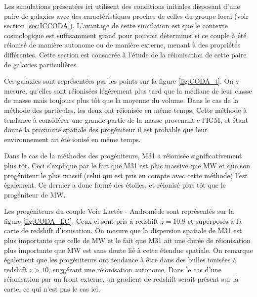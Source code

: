 Les simulations présentées ici utilisent des conditions initiales disposant d'une paire de galaxies avec des caractéristiques proches de celles du groupe local (voir section \ref{sec:ICCODA}).
L'avantage de cette simulation est que le contexte cosmologique est suffisamment grand pour pouvoir déterminer si ce couple à été réionisé de manière autonome ou de manière externe, menant à des propriétés différentes.
Cette section est consacrée à l'étude de la réionisation de cette paire de galaxies particulières.

Ces galaxies sont représentées par les points sur la figure \ref{fig:CODA_t}. 
On y mesure, qu'elles sont réionisées légèrement plus tard que la médiane de leur classe de masse mais toujours plus tôt que la moyenne du volume.
Dans le cas de la méthode des particules, les deux ont réionisée en même temps.
Cette méthode à tendance à considérer une grande partie de la masse provenant e l'\ac{IGM}, et étant donné la proximité spatiale des progéniteur il est probable que leur environnement ait été ionisé en même temps.

Dans le cas de la méthodes des progéniteurs, M31 a réionisée significativement plus tôt.
Ceci s'explique par le fait que M31 est plus massive que MW et que son progéniteur le plus massif (celui qui est pris en compte avec cette méthode) l'est également.
Ce dernier a donc formé des étoiles, et réionisé plus tôt que le progéniteur de MW.



Les progéniteurs du couple Voie Lactée - Andromède sont représentés sur la figure \ref{fig:CODA_LG}.
Ceux ci sont pris à redshift $z=10.8$ et superposés à la carte de redshift d'ionisation.
On mesure que la dispersion spatiale de M31 est plus importante que celle de MW et le fait que M31 ait une durée de réionisation plus importante que MW est sans doute lié à cette étendue spatiale.
On remarque également que les progéniteurs ont tendance à être dans des bulles ionisées à redshift $z>10$, suggérant une réionisation autonome.
Dans le cas d'une réionisation par un front externe, un gradient de redshift serait présent sur la carte, ce qui n'est pas le cas ici.

